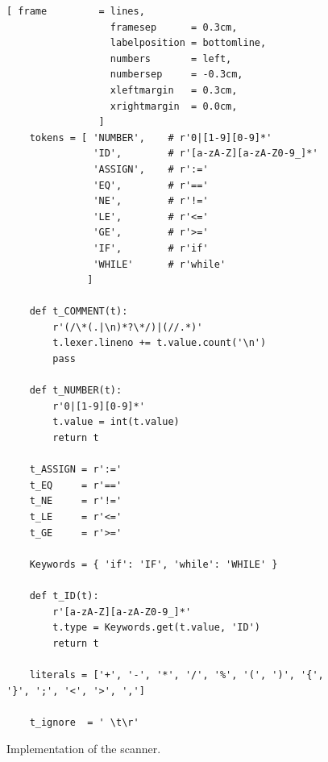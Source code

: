 \begin{figure}[!ht]
\centering
\begin{Verbatim}[ frame         = lines, 
                  framesep      = 0.3cm, 
                  labelposition = bottomline,
                  numbers       = left,
                  numbersep     = -0.3cm,
                  xleftmargin   = 0.3cm,
                  xrightmargin  = 0.0cm,
                ]
    tokens = [ 'NUMBER',    # r'0|[1-9][0-9]*'
               'ID',        # r'[a-zA-Z][a-zA-Z0-9_]*'
               'ASSIGN',    # r':='
               'EQ',        # r'=='
               'NE',        # r'!='
               'LE',        # r'<='
               'GE',        # r'>='
               'IF',        # r'if'
               'WHILE'      # r'while'
              ]
    
    def t_COMMENT(t):
        r'(/\*(.|\n)*?\*/)|(//.*)'
        t.lexer.lineno += t.value.count('\n')
        pass
    
    def t_NUMBER(t):
        r'0|[1-9][0-9]*'
        t.value = int(t.value)
        return t
    
    t_ASSIGN = r':='
    t_EQ     = r'=='
    t_NE     = r'!='
    t_LE     = r'<='
    t_GE     = r'>='
    
    Keywords = { 'if': 'IF', 'while': 'WHILE' }
    
    def t_ID(t):
        r'[a-zA-Z][a-zA-Z0-9_]*'
        t.type = Keywords.get(t.value, 'ID')
        return t
    
    literals = ['+', '-', '*', '/', '%', '(', ')', '{', '}', ';', '<', '>', ',']
    
    t_ignore  = ' \t\r'
\end{Verbatim}
\vspace*{-0.3cm} %
\caption{Implementation of the scanner.}
\label{fig:Interpreter-Scanner}
\end{figure}

